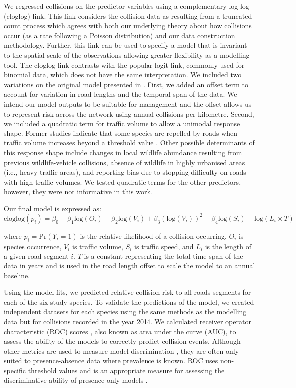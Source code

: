 We regressed collisions on the predictor variables using a complementary log-log (cloglog) link.  This link considers the collision data as resulting from a truncated count process which agrees with both our underlying theory about how collisions occur (as a rate following a Poisson distribution) and our data construction methodology. Further, this link can be used to specify a model that is invariant to the spatial scale of the observations allowing greater flexibility as a modelling tool. The cloglog link contrasts with the popular logit link, commonly used for binomial data, which does not have the same interpretation. We included two variations on the original model presented in . First, we added an offset term to account for variation in road lengths and the temporal span of the data. We intend our model outputs to be suitable for management and the offset allows us to represent risk across the network using annual collisions per kilometre. Second, we included a quadratic term for traffic volume to allow a unimodal response shape. Former studies indicate that some species are repelled by roads when traffic volume increases beyond a threshold value \citep[e.g.][]{seil05,gagn07}. Other possible determinants of this response shape include changes in local wildlife abundance resulting from previous wildlife-vehicle collisions, absence of wildlife in highly urbanised areas (i.e., heavy traffic areas), and reporting bias due to stopping difficulty on roads with high traffic volumes. We tested quadratic terms for the other predictors, however, they were not informative in this work.

Our final model is expressed as: 
\begin{equation}
\text{cloglog}(p_i) = \beta_0 + \beta_1 \text{log}(O_i) + \beta_2 \text{log}(V_i) + \beta_3 (\text{log}(V_i))^2 + \beta_4 \text{log}(S_i) + \text{log}(L_i \times T)
\end{equation}

\noindent where $p_i=\text{Pr}(Y_i=1)$ is the relative likelihood of a collision occurring, $O_i$ is species occurrence, $V_i$ is traffic volume, $S_i$ is traffic speed, and $L_i$ is the length of a given road segment $i$. $T$ is a constant representing the total time span of the data in years and is used in the road length offset to scale the model to an annual baseline.

Using the model fits, we predicted relative collision risk to all roads segments for each of the six study species.  To validate the predictions of the model, we created independent datasets for each species using the same methods as the modelling data but for collisions recorded in the year 2014.  We calculated receiver operator characteristic (ROC) scores \citep{metz78}, also known as area under the curve (AUC), to assess the ability of the models to correctly predict collision events. Although other metrics are used to measure model discrimination \citep[e.g. true skill statistic (TSS), see][]{allo06}, they are often only suited to presence-absence data where prevalence is known. ROC uses non-specific threshold values and is an appropriate measure for assessing the discriminative ability of presence-only models \citep{laws14}. 

